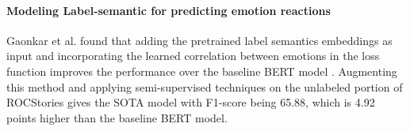 \paragraph{Modeling Label-semantic for predicting emotion reactions}
Gaonkar et al. found that adding the pretrained label semantics embeddings as input and incorporating the learned correlation between emotions in the loss function improves the performance over the baseline BERT model \citet{gaonkar2020modeling}. Augmenting this method and applying semi-supervised techniques on the unlabeled portion of ROCStories gives the SOTA model with F1-score being 65.88, which is 4.92 points higher than the baseline BERT model. 
